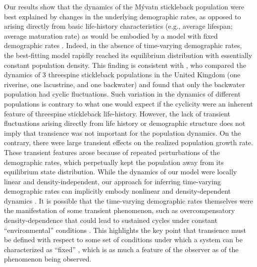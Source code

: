 \documentclass[11pt]{article}
\begin{document}
Our results show that the dynamics of the M\'{y}vatn stickleback population
were best explained by changes in the underlying demographic rates,
as opposed to arising directly from basic life-history characteristics
(e.g., average lifespan; average maturation rate)
as would be embodied by a model with fixed demographic rates \citep{caswell2001matrix}.
Indeed, in the absence of time-varying demographic rates,
the best-fitting model rapidly reached its equilibrium distribution
with essentially constant population density.
This finding is consistent with \cite{wootton2005},
who compared the dynamics of 3 threespine stickleback populations in the United Kingdom
(one riverine, one lacustrine, and one backwater)
and found that only the backwater population had cyclic fluctuations.
Such variation in the dynamics of different populations
is contrary to what one would expect if the cyclicity were
an inherent feature of threespine stickleback life-history.
However, the lack of transient fluctuations arising directly
from life history or demographic structure
does not imply that transience was not important for the population dynamics.
On the contrary,
there were large transient effects on the realized population growth rate.
These transient features arose because of repeated perturbations
of the demographic rates, which perpetually kept the population
away from its equilibrium state distribution.
While the dynamics of our model were locally linear and density-independent,
our approach for inferring time-varying demographic rates can implicitly embody
nonlinear and density-dependent dynamics \citep{ives2012}.
It is possible that the time-varying demographic rates themselves were the manifestation
of some transient phenomenon,
such as overcompensatory density-dependence that could lead to sustained cycles under
constant ``environmental'' conditions
\citep[e.g.,][]{may1974}.
This highlights the key point that transience must be defined with respect to some
set of conditions under which a system can be characterized as ``fixed''
\citep{hastings2010},
which is as much a feature of the observer as of the phenomenon being observed.
\end{document}
